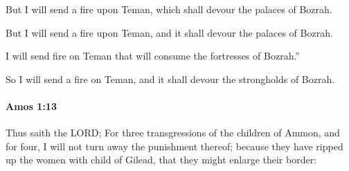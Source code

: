 			But I will send a fire upon Teman, which shall devour the palaces of Bozrah.

			\begin{versebox}
					\item[BHS] 
					\item[LXX] 
					\item[ASV] But I will send a fire upon Teman, and it shall devour the palaces of Bozrah.
					\item[NIV] I will send fire on Teman that will consume the fortresses of Bozrah.”
					\item[NRSV] So I will send a fire on Teman, and it shall devour the strongholds of Bozrah.
			\end{versebox}

		\paragraph{Amos 1:13} %
			\label{AMOS-1-13}

			Thus saith the LORD; For three transgressions of the children of Ammon, and for four, I will not turn away the punishment thereof; because they have ripped up the women with child of Gilead, that they might enlarge their border:

